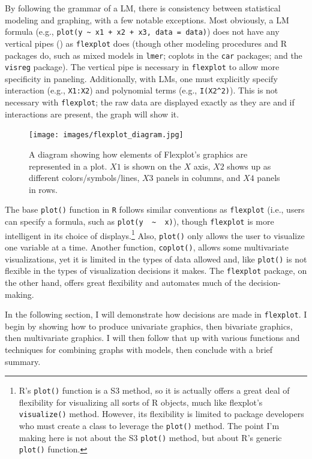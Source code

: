 \documentclass[
  english,
  man]{apa6}
\begin{document}
By following the grammar of a LM, there is consistency between statistical modeling and graphing, with a few notable exceptions. Most obviously, a LM formula (e.g., \texttt{plot(y\ \textasciitilde{}\ x1\ +\ x2\ +\ x3,\ data\ =\ data)}) does not have any vertical pipes (\texttt{\textbar{}}) as \texttt{flexplot} does (though other modeling procedures and R packages do, such as mixed models in \texttt{lmer}; coplots in the \texttt{car} packages; and the \texttt{visreg} package). The vertical pipe is necessary in \texttt{flexplot} to allow more specificity in paneling. Additionally, with LMs, one must explicitly specify interaction (e.g., \texttt{X1:X2}) and polynomial terms (e.g., \texttt{I(X2\^{}2)}). This is not necessary with \texttt{flexplot}; the raw data are displayed exactly as they are and if interactions are present, the graph will show it.

\begin{figure}
\centering
\texttt{[image: images/flexplot\_diagram.jpg]}
\caption{A diagram showing how elements of Flexplot's graphics are represented in a plot. $X1$ is shown on the $X$ axis, $X2$ shows up as different colors/symbols/lines, $X3$ panels in columns, and $X4$ panels in rows.}
\label{fig:flexplotgrammar}
\end{figure}

The base \texttt{plot()} function in \texttt{R} follows similar conventions as \texttt{flexplot} (i.e., users can specify a formula, such as \texttt{plot(y\ \ \textasciitilde{}\ \ x)}), though \texttt{flexplot} is more intelligent in its choice of displays.\footnote{R's \texttt{plot()} function is a S3 method, so it is actually offers a great deal of flexibility for visualizing all sorts of R objects, much like flexplot's \texttt{visualize()} method. However, its flexibility is limited to package developers who must create a class to leverage the \texttt{plot()} method. The point I'm making here is not about the S3 \texttt{plot()} method, but about R's generic \texttt{plot()} function.} Also, \texttt{plot()} only allows the user to visualize one variable at a time. Another function, \texttt{coplot()}, allows some multivariate visualizations, yet it is limited in the types of data allowed and, like \texttt{plot()} is not flexible in the types of visualization decisions it makes. The \texttt{flexplot} package, on the other hand, offers great flexibility and automates much of the decision-making.

In the following section, I will demonstrate how decisions are made in \texttt{flexplot}. I begin by showing how to produce univariate graphics, then bivariate graphics, then multivariate graphics. I will then follow that up with various functions and techniques for combining graphs with models, then conclude with a brief summary.
\end{document}
